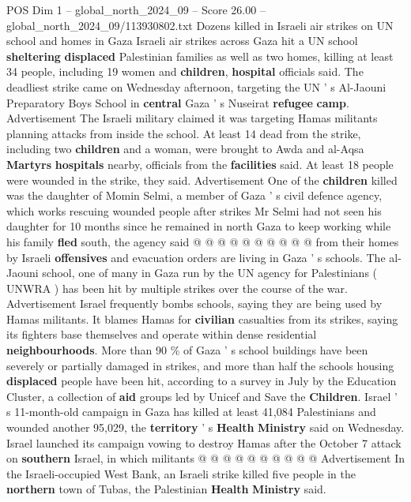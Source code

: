 \begin{textsample}{POS Dim 1 – global\_north\_2024\_09 – Score 26.00 – global\_north\_2024\_09/113930802.txt}  \label{ex:f1_pos_422}
Dozens killed in Israeli air strikes on UN school and homes in Gaza Israeli air strikes across Gaza hit a UN school \textbf{sheltering} \textbf{displaced} Palestinian families as well as two homes, killing at least 34 people, including 19 women and \textbf{children}, \textbf{hospital} officials said.
The deadliest strike came on Wednesday afternoon, targeting the UN ' s Al-Jaouni Preparatory Boys School in \textbf{central} Gaza ' s Nuseirat \textbf{refugee} \textbf{camp}.
Advertisement The Israeli military claimed it was targeting Hamas militants planning attacks from inside the school.
At least 14 dead from the strike, including two \textbf{children} and a woman, were brought to Awda and al-Aqsa \textbf{Martyrs} \textbf{hospitals} nearby, officials from the \textbf{facilities} said.
At least 18 people were wounded in the strike, they said.
Advertisement One of the \textbf{children} killed was the daughter of Momin Selmi, a member of Gaza ' s civil defence agency, which works rescuing wounded people after strikes Mr Selmi had not seen his daughter for 10 months since he remained in north Gaza to keep working while his family \textbf{fled} south, the agency said @ @ @ @ @ @ @ @ @ @ from their homes by Israeli \textbf{offensives} and evacuation orders are living in Gaza ' s schools.
The al-Jaouni school, one of many in Gaza run by the UN agency for Palestinians ( UNWRA ) has been hit by multiple strikes over the course of the war.
Advertisement Israel frequently bombs schools, saying they are being used by Hamas militants.
It blames Hamas for \textbf{civilian} casualties from its strikes, saying its fighters base themselves and operate within dense residential \textbf{neighbourhoods}.
More than 90 \% of Gaza ' s school buildings have been severely or partially damaged in strikes, and more than half the schools housing \textbf{displaced} people have been hit, according to a survey in July by the Education Cluster, a collection of \textbf{aid} groups led by Unicef and Save the \textbf{Children}.
Israel ' s 11-month-old campaign in Gaza has killed at least 41,084 Palestinians and wounded another 95,029, the \textbf{territory} ' s \textbf{Health} \textbf{Ministry} said on Wednesday.
Israel launched its campaign vowing to destroy Hamas after the October 7 attack on \textbf{southern} Israel, in which militants @ @ @ @ @ @ @ @ @ @ Advertisement In the Israeli-occupied West Bank, an Israeli strike killed five people in the \textbf{northern} town of Tubas, the Palestinian \textbf{Health} \textbf{Ministry} said.

\end{textsample}

